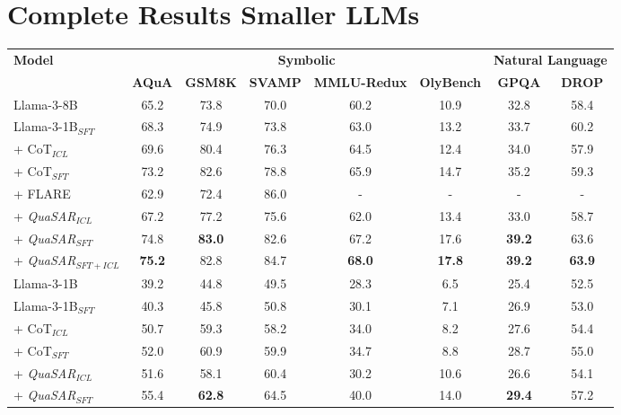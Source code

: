 \documentclass[11pt]{article}
\newcommand{\QuaSAR}{\emph{QuaSAR}\xspace}
\begin{document}
\begin{table*}[]
\section{Complete Results Smaller LLMs}
\label{app:results_tuning_SiC_complete}
\centering
\tiny
\begin{tabular}{lccccccc}
\toprule
\multirow{2}{*}{\textbf{Model}} & \multicolumn{5}{c}{\textbf{Symbolic}} & \multicolumn{2}{c}{\textbf{Natural Language}} \\
\cmidrule(lr){2-6} \cmidrule(lr){7-8}
& \textbf{AQuA} & \textbf{GSM8K} & \textbf{SVAMP} & \textbf{MMLU-Redux} & \textbf{OlyBench} & \textbf{GPQA} & \textbf{DROP} \\
\midrule
Llama-3-8B & 65.2 & 73.8 & 70.0 & 60.2 & 10.9 & 32.8 & 58.4 \\
Llama-3-1B$_{SFT}$ & 68.3 & 74.9 & 73.8 & 63.0 & 13.2 & 33.7 & 60.2 \\
+ CoT$_{ICL}$ & 69.6 & 80.4 & 76.3 & 64.5 & 12.4 & 34.0 & 57.9 \\
+ CoT$_{SFT}$ & 73.2 & 82.6 & 78.8 & 65.9 & 14.7 & 35.2 & 59.3 \\
+ FLARE \cite{arakelyan2024flarefaithfullogicaidedreasoning} & 62.9 & 72.4 & 86.0 & - & - & - & - \\
+ \QuaSAR$_{ICL}$  & 67.2 & 77.2  & 75.6  & 62.0  & 13.4  & 33.0   & 58.7  \\ 

+ \QuaSAR$_{SFT}$ & 74.8 &  \textbf{83.0} &  82.6 &  67.2 & 17.6 &  \textbf{39.2}  &  63.6 \\ 

+ \QuaSAR$_{SFT+ICL}$ & \textbf{75.2} &  82.8 &  84.7 &  \textbf{68.0} &  \textbf{17.8} &  \textbf{39.2}  &  \textbf{63.9} \\ 

\midrule
Llama-3-1B & 39.2 & 44.8 & 49.5 & 28.3 & 6.5 & 25.4 & 52.5 \\
Llama-3-1B$_{SFT}$ & 40.3 & 45.8 & 50.8 & 30.1 & 7.1 & 26.9 & 53.0 \\

+ CoT$_{ICL}$ & 50.7 & 59.3 & 58.2 & 34.0 & 8.2 & 27.6 & 54.4 \\

+ CoT$_{SFT}$ & 52.0 & 60.9 & 59.9 & 34.7 & 8.8 & 28.7 & 55.0 \\

+ \QuaSAR$_{ICL}$ & 51.6 & 58.1 & 60.4 & 30.2 & 10.6 & 26.6 & 54.1 \\ 

+ \QuaSAR$_{SFT}$ & 55.4 & \textbf{62.8} & 64.5 & 40.0 & 14.0 & \textbf{29.4} & 57.2 \\ 


\end{tabular}
\end{table*}
\end{document}
